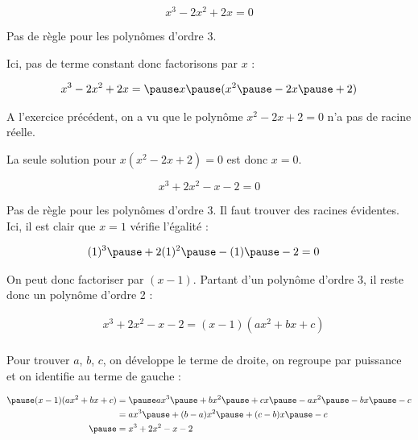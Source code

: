 \documentclass[9pt,professionalfonts,handout,hyperref]{beamer}
\begin{document}
\begin{frame}

$$x^3-2x^2+2x = 0$$

\pause Pas de règle pour les polynômes d'ordre 3.\newline

\pause Ici, pas de terme constant donc factorisons par $x$ :

\[\begin{aligned}
&x^3-2x^2+2x =\pause x\pause (x^2\pause -2x\pause +2) \\
\end{aligned}\]

\pause A l'exercice précédent, on a vu que le polynôme $x^2-2x+2 = 0$ n'a pas de racine réelle.\newline

\pause La seule solution pour $x(x^2-2x+2) = 0$ \pause est donc $x=0$.

\end{frame}


\begin{frame}

$$x^3+2x^2-x-2 = 0$$

\pause Pas de règle pour les polynômes d'ordre 3. \pause Il faut trouver des racines évidentes. \pause Ici, il est clair que $x=1$ vérifie l'égalité :

\[\begin{aligned}
&(1)^3\pause +2(1)^2\pause -(1)\pause -2 = 0
\end{aligned}\]

On peut donc factoriser par $(x-1)$. \pause Partant d'un polynôme d'ordre 3, il reste donc un polynôme d'ordre 2 :

\[\begin{aligned}
&x^3+2x^2-x-2 = (x-1)(ax^2+bx+c) \\
\end{aligned}\]

\pause Pour trouver $a$, $b$, $c$, on développe le terme de droite, on regroupe par puissance et on identifie au terme de gauche :

\[\begin{aligned}
\pause (x-1)(ax^2+bx+c)
&= \pause ax^3\pause +bx^2\pause +cx \pause - ax^2\pause -bx\pause -c\\
&= ax^3\pause +(b-a)x^2\pause +(c-b)x \pause -c\\
\pause &= x^3+2x^2-x-2\end{aligned}\]

\end{frame}
\end{document}
